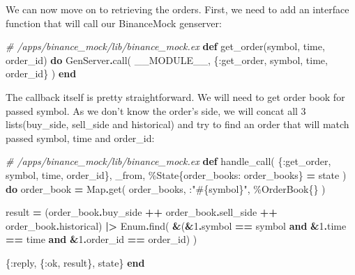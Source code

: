 \documentclass[
]{book}
\newenvironment{Shaded}{\begin{snugshade}}{\end{snugshade}}
\newcommand{\CommentTok}[1]{\textcolor[rgb]{0.56,0.35,0.01}{\textit{#1}}}
\newcommand{\ConstantTok}[1]{\textcolor[rgb]{0.00,0.00,0.00}{#1}}
\newcommand{\DecValTok}[1]{\textcolor[rgb]{0.00,0.00,0.81}{#1}}
\newcommand{\KeywordTok}[1]{\textcolor[rgb]{0.13,0.29,0.53}{\textbf{#1}}}
\newcommand{\NormalTok}[1]{#1}
\newcommand{\OperatorTok}[1]{\textcolor[rgb]{0.81,0.36,0.00}{\textbf{#1}}}
\newcommand{\OtherTok}[1]{\textcolor[rgb]{0.56,0.35,0.01}{#1}}
\newcommand{\StringTok}[1]{\textcolor[rgb]{0.31,0.60,0.02}{#1}}
\newcommand{\VariableTok}[1]{\textcolor[rgb]{0.00,0.00,0.00}{#1}}
\begin{document}
We can now move on to retrieving the orders. First, we need to add an interface function that will call our BinanceMock genserver:

\begin{Shaded}
\begin{Highlighting}[]
\CommentTok{\# /apps/binance\_mock/lib/binance\_mock.ex}
  \KeywordTok{def}\NormalTok{ get\_order(symbol, time, order\_id) }\KeywordTok{do}
    \ConstantTok{GenServer}\OperatorTok{.}\NormalTok{call(}
      \ConstantTok{\_\_MODULE\_\_}\NormalTok{,}
\NormalTok{      \{}\VariableTok{:get\_order}\NormalTok{, symbol, time, order\_id\}}
\NormalTok{    )}
  \KeywordTok{end}
\end{Highlighting}
\end{Shaded}

The callback itself is pretty straightforward. We will need to get order book for passed symbol. As we don't know the order's side, we will concat all 3 lists(buy\_side, sell\_side and historical) and try to find an order that will
match passed symbol, time and order\_id:

\begin{Shaded}
\begin{Highlighting}[]
\CommentTok{\# /apps/binance\_mock/lib/binance\_mock.ex}
  \KeywordTok{def}\NormalTok{ handle\_call(}
\NormalTok{        \{}\VariableTok{:get\_order}\NormalTok{, symbol, time, order\_id\},}
\NormalTok{        \_from,}
\NormalTok{        \%}\ConstantTok{State}\NormalTok{\{}\VariableTok{order\_books:}\NormalTok{ order\_books\} }\OperatorTok{=}\NormalTok{ state}
\NormalTok{      ) }\KeywordTok{do}
\NormalTok{    order\_book }\OperatorTok{=}
      \ConstantTok{Map}\OperatorTok{.}\NormalTok{get(}
\NormalTok{        order\_books,}
\NormalTok{        :}\StringTok{"}\OtherTok{\#\{}\NormalTok{symbol}\OtherTok{\}}\StringTok{"}\NormalTok{,}
\NormalTok{        \%}\ConstantTok{OrderBook}\NormalTok{\{\}}
\NormalTok{      )}

\NormalTok{    result }\OperatorTok{=}
\NormalTok{      (order\_book}\OperatorTok{.}\NormalTok{buy\_side }\OperatorTok{++}
\NormalTok{         order\_book}\OperatorTok{.}\NormalTok{sell\_side }\OperatorTok{++}
\NormalTok{         order\_book}\OperatorTok{.}\NormalTok{historical)}
      \OperatorTok{|\textgreater{}} \ConstantTok{Enum}\OperatorTok{.}\NormalTok{find(}
        \OperatorTok{\&}\NormalTok{(}\OperatorTok{\&}\DecValTok{1}\OperatorTok{.}\NormalTok{symbol }\OperatorTok{==}\NormalTok{ symbol }\KeywordTok{and}
            \OperatorTok{\&}\DecValTok{1}\OperatorTok{.}\NormalTok{time }\OperatorTok{==}\NormalTok{ time }\KeywordTok{and}
            \OperatorTok{\&}\DecValTok{1}\OperatorTok{.}\NormalTok{order\_id }\OperatorTok{==}\NormalTok{ order\_id)}
\NormalTok{      )}

\NormalTok{    \{}\VariableTok{:reply}\NormalTok{, \{}\VariableTok{:ok}\NormalTok{, result\}, state\}}
  \KeywordTok{end}
\end{Highlighting}
\end{Shaded}
\end{document}
